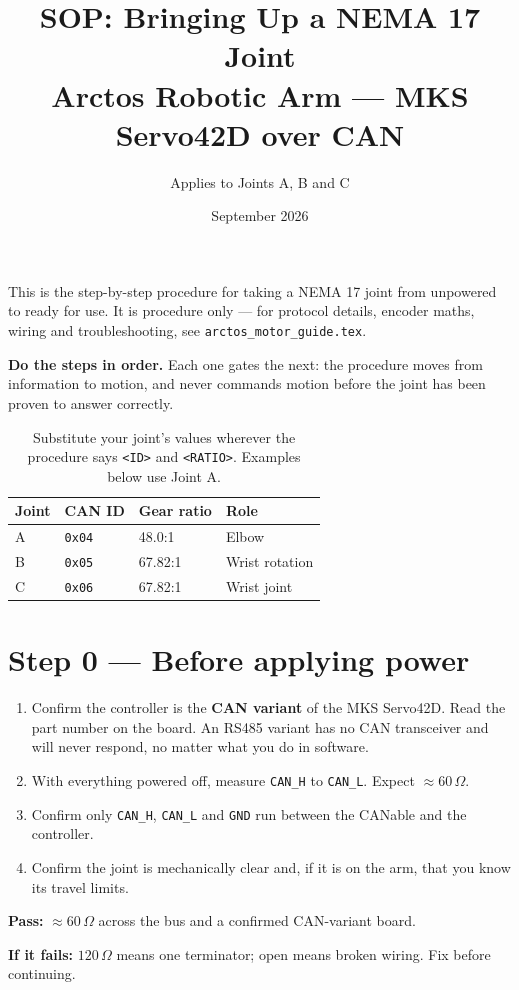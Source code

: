 \documentclass[11pt,letterpaper]{article}
\title{SOP: Bringing Up a NEMA 17 Joint \\ \large Arctos Robotic Arm --- MKS Servo42D over CAN}
\author{Applies to Joints A, B and C}
\date{September 2026}
\newcommand{\passif}[1]{\par\vspace{2pt}\noindent\textbf{\color{okgreen}Pass:} #1\par\vspace{4pt}}
\newcommand{\failif}[1]{\noindent\textbf{If it fails:} #1\par\vspace{6pt}}
\begin{document}
\maketitle

\noindent This is the step-by-step procedure for taking a NEMA 17 joint from
unpowered to ready for use. It is procedure only --- for protocol details, encoder
maths, wiring and troubleshooting, see \texttt{arctos\_motor\_guide.tex}.

\medskip
\noindent\textbf{Do the steps in order.} Each one gates the next: the procedure moves
from information to motion, and never commands motion before the joint has been
proven to answer correctly.

\begin{table}[h]
\centering
\begin{tabular}{llll}
\toprule
\textbf{Joint} & \textbf{CAN ID} & \textbf{Gear ratio} & \textbf{Role} \\ \midrule
A & \texttt{0x04} & 48.0:1  & Elbow \\
B & \texttt{0x05} & 67.82:1 & Wrist rotation \\
C & \texttt{0x06} & 67.82:1 & Wrist joint \\
\bottomrule
\end{tabular}
\caption{Substitute your joint's values wherever the procedure says
\texttt{<ID>} and \texttt{<RATIO>}. Examples below use Joint A.}
\end{table}

\section*{Step 0 --- Before applying power}
\begin{enumerate}[leftmargin=*]
    \item Confirm the controller is the \textbf{CAN variant} of the MKS Servo42D.
          Read the part number on the board. An RS485 variant has no CAN transceiver
          and will never respond, no matter what you do in software.
    \item With everything powered off, measure \texttt{CAN\_H} to \texttt{CAN\_L}.
          Expect $\approx 60\,\Omega$.
    \item Confirm only \texttt{CAN\_H}, \texttt{CAN\_L} and \texttt{GND} run between
          the CANable and the controller.
    \item Confirm the joint is mechanically clear and, if it is on the arm, that you
          know its travel limits.
\end{enumerate}
\passif{$\approx 60\,\Omega$ across the bus and a confirmed CAN-variant board.}
\failif{$120\,\Omega$ means one terminator; open means broken wiring. Fix before continuing.}
\end{document}
